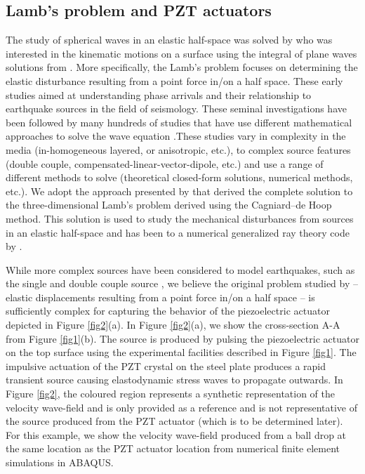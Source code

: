 \documentclass[preprint,3p, 11pt,authoryear]{elsarticle}
\begin{document}
\subsection{Lamb's problem and PZT actuators}

The study of spherical waves in an elastic half-space was solved by \citet{Lamb1904} who was interested in the kinematic motions on a surface using the integral of plane waves solutions from \citet{Rayleigh1988}. More specifically, the Lamb's problem focuses on determining the elastic disturbance resulting from a point force in/on a half space. These early studies aimed at understanding phase arrivals and their relationship to earthquake sources in the field of seismology. These seminal investigations have been followed by many hundreds of studies that have use different mathematical approaches to solve the wave equation \citep[e.g. ch 6 in][]{Aki2002}.These studies vary in complexity in the media (in-homogeneous layered, or anisotropic, etc.), to complex source features (double couple, compensated-linear-vector-dipole, etc.) and use a range of different methods to solve (theoretical closed-form solutions, numerical methods, etc.). We adopt the approach presented by \citet{Johnson1974} that derived the complete solution to the three-dimensional Lamb’s problem derived using the Cagniard--de Hoop method. This solution is used to study the mechanical disturbances from sources in an elastic half-space and has been to a numerical generalized ray theory code by \citet{Hsu1985} \citep[see also][]{McLaskey2011, McLaskey2012, Selvadurai2019}.

While more complex sources have been considered to model earthquakes, such as the single and double couple source \citet{Sato1972}, we believe the original problem studied by \citet{Lamb1904} -- elastic displacements resulting from a point force in/on a half space -- is sufficiently complex for capturing the behavior of the piezoelectric actuator depicted in Figure \ref{fig2}(a). In Figure \ref{fig2}(a), we show the cross-section A-A from Figure \ref{fig1}(b). The source is produced by pulsing the piezoelectric actuator on the top surface using the experimental facilities described in Figure \ref{fig1}. The impulsive actuation of the PZT crystal on the steel plate produces a rapid transient source causing elastodynamic stress waves to propagate outwards. In Figure \ref{fig2}, the coloured region represents a synthetic representation of the velocity wave-field and is only provided as a reference and is not representative of the source produced from the PZT actuator (which is to be determined later). For this example, we show the velocity wave-field produced from a ball drop at the same location as the PZT actuator location from numerical finite element simulations in ABAQUS. 
\end{document}

